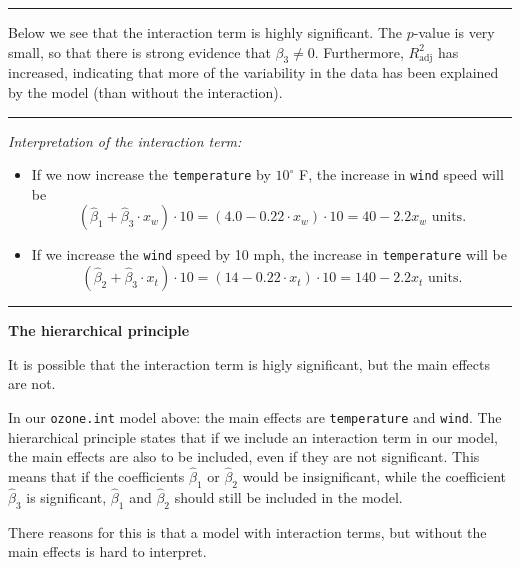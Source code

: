 \documentclass[]{article}
\begin{document}
\normalsize

\begin{center}\rule{0.5\linewidth}{\linethickness}\end{center}

Below we see that the interaction term is highly significant. The
\(p\)-value is very small, so that there is strong evidence that
\(\beta_3 \neq 0\). Furthermore, \(R^2_{\text{adj}}\) has increased,
indicating that more of the variability in the data has been explained
by the model (than without the interaction).

\begin{center}\rule{0.5\linewidth}{\linethickness}\end{center}

\emph{Interpretation of the interaction term:}

\begin{itemize}
\item
  If we now increase the \texttt{temperature} by \(10^{\circ}\) F, the
  increase in \texttt{wind} speed will be
  \[(\hat \beta_1+\hat \beta_3 \cdot x_w) \cdot 10 = (4.0 -0.22 \cdot x_w) \cdot 10 = 40-2.2 x_w \text{ units}.\]
\item
  If we increase the \texttt{wind} speed by 10 mph, the increase in
  \texttt{temperature} will be
  \[(\hat \beta_2 + \hat \beta_3 \cdot x_t) \cdot 10 = (14 -0.22 \cdot x_t) \cdot 10 = 140-2.2 x_t \text{ units}.\]
\end{itemize}

\begin{center}\rule{0.5\linewidth}{\linethickness}\end{center}

\textbf{The hierarchical principle}

It is possible that the interaction term is higly significant, but the
main effects are not.

In our \texttt{ozone.int} model above: the main effects are
\texttt{temperature} and \texttt{wind}. The hierarchical principle
states that if we include an interaction term in our model, the main
effects are also to be included, even if they are not significant. This
means that if the coefficients \(\hat \beta_1\) or \(\hat \beta_2\)
would be insignificant, while the coefficient \(\hat \beta_3\) is
significant, \(\hat \beta_1\) and \(\hat \beta_2\) should still be
included in the model.

There reasons for this is that a model with interaction terms, but
without the main effects is hard to interpret.
\end{document}
